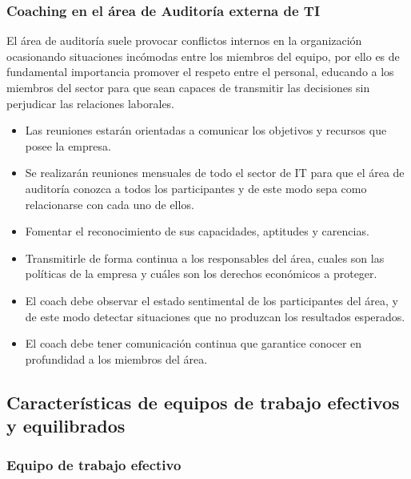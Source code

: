         \subsubsection{Coaching en el área de Auditoría externa de TI}        
        El área de auditoría  suele provocar conflictos internos en la organización ocasionando situaciones incómodas entre los miembros del equipo, por ello es de fundamental importancia promover el respeto entre el personal, educando a los miembros del sector para que sean capaces de transmitir las decisiones sin perjudicar las relaciones laborales.
        \begin{itemize}
	        \item Las reuniones estarán orientadas a comunicar los objetivos y recursos que posee la empresa.
            \item Se realizarán reuniones mensuales de todo el sector de IT para que el área de auditoría conozca a todos los participantes y de este modo sepa como relacionarse con cada uno de ellos.
            \item Fomentar el reconocimiento de sus capacidades, aptitudes y carencias.
            \item Transmitirle de forma continua a los responsables del área, cuales son las políticas de la empresa y cuáles son los derechos económicos a proteger.
            \item  El coach debe observar el estado sentimental de los participantes del área, y de este modo detectar situaciones que no produzcan los resultados esperados.
            \item El coach debe tener comunicación continua que garantice conocer en profundidad a los miembros del área.
            
        \end{itemize}



\newpage

    \subsection{Características de equipos de trabajo efectivos y equilibrados} %
    

\subsubsection{Equipo de trabajo efectivo}

